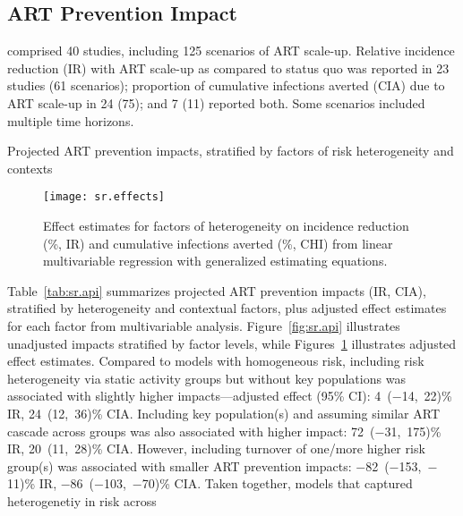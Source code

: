 \subsection{ART Prevention Impact}\label{sr.res.api}
 comprised 40 studies, including 125 scenarios of ART scale-up.
Relative incidence reduction (IR) with ART scale-up as compared to status quo
was reported in 23 studies (61 scenarios);
proportion of cumulative infections averted (CIA) due to ART scale-up
in 24 (75); and 7 (11) reported both.
Some scenarios included multiple time horizons.
\begin{table}
  \centering
  \caption{Projected ART prevention impacts,
    stratified by factors of risk heterogeneity and contexts}
  \label{tab:sr.api}
  
\end{table}
\begin{figure}[h]
  \centering
  \texttt{[image: sr.effects]}
  \caption{Effect estimates for factors of heterogeneity on
    incidence reduction (\%, IR) and cumulative infections averted (\%, CHI)
    from linear multivariable regression with generalized estimating equations.}
  \label{fig:sr.effects}
\end{figure}
Table~\ref{tab:sr.api} summarizes projected ART prevention impacts (IR, CIA),
stratified by heterogeneity and contextual factors,
plus adjusted effect estimates for each factor from multivariable analysis.
Figure~\ref{fig:sr.api} illustrates
unadjusted impacts stratified by factor levels, while
Figures~\ref{fig:sr.effects} illustrates adjusted effect estimates.
Compared to models with homogeneous risk,
including risk heterogeneity via static activity groups but without key populations
was associated with slightly higher impacts---adjusted effect (95\% CI):
4~($-$14,~22)\% IR, 24~(12,~36)\% CIA.
Including key population(s) and assuming similar ART cascade across groups
was also associated with higher impact:
72~($-$31,~175)\% IR, 20~(11,~28)\% CIA.
However, including turnover of one/more higher risk group(s)
was associated with smaller ART prevention impacts:
$-$82~($-$153,~$-$11)\% IR, $-$86~($-$103,~$-$70)\% CIA.
Taken together, models that captured heterogenetiy in risk across
